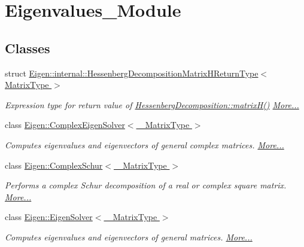 \hypertarget{group___eigenvalues___module}{}\section{Eigenvalues\+\_\+\+Module}
\label{group___eigenvalues___module}
\subsection*{Classes}
\begin{DoxyCompactItemize}
\item 
struct \hyperlink{group___eigenvalues___module_struct_eigen_1_1internal_1_1_hessenberg_decomposition_matrix_h_return_type}{Eigen\+::internal\+::\+Hessenberg\+Decomposition\+Matrix\+H\+Return\+Type$<$ Matrix\+Type $>$}
\begin{DoxyCompactList}\small\item\em Expression type for return value of \hyperlink{group___eigenvalues___module_a8e781d2e22a2304647bcf0ae913cc8ea}{Hessenberg\+Decomposition\+::matrix\+H()}  \hyperlink{group___eigenvalues___module_struct_eigen_1_1internal_1_1_hessenberg_decomposition_matrix_h_return_type}{More...}\end{DoxyCompactList}\item 
class \hyperlink{group___eigenvalues___module_class_eigen_1_1_complex_eigen_solver}{Eigen\+::\+Complex\+Eigen\+Solver$<$ \+\_\+\+Matrix\+Type $>$}
\begin{DoxyCompactList}\small\item\em Computes eigenvalues and eigenvectors of general complex matrices.  \hyperlink{group___eigenvalues___module_class_eigen_1_1_complex_eigen_solver}{More...}\end{DoxyCompactList}\item 
class \hyperlink{group___eigenvalues___module_class_eigen_1_1_complex_schur}{Eigen\+::\+Complex\+Schur$<$ \+\_\+\+Matrix\+Type $>$}
\begin{DoxyCompactList}\small\item\em Performs a complex Schur decomposition of a real or complex square matrix.  \hyperlink{group___eigenvalues___module_class_eigen_1_1_complex_schur}{More...}\end{DoxyCompactList}\item 
class \hyperlink{group___eigenvalues___module_class_eigen_1_1_eigen_solver}{Eigen\+::\+Eigen\+Solver$<$ \+\_\+\+Matrix\+Type $>$}
\begin{DoxyCompactList}\small\item\em Computes eigenvalues and eigenvectors of general matrices.  \hyperlink{group___eigenvalues___module_class_eigen_1_1_eigen_solver}{More...}\end{DoxyCompactList}\item 

\end{DoxyCompactItemize}
